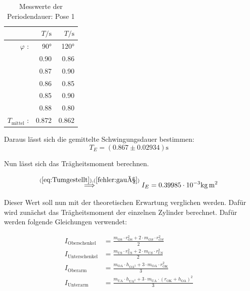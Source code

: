\begin{table}[H]
  \centering
  \caption{Messwerte der Periodendauer: Pose 1}
  \label{tab:PeriodendauerPose1}
  \begin{tabular}{rrr}
    \toprule
     & $T / \unit\second$ &  $T / \unit\second$  \\
    \midrule
    $\varphi$ : & 90° & 120° \\
    \midrule
          & 0.90 &        0.86 \\
          & 0.87 &        0.90 \\
          & 0.86 &        0.85 \\
          & 0.85 &        0.90 \\
          & 0.88 &        0.80 \\
    \midrule
    $T_{\text{mittel}}$ : & 0.872 & 0.862 \\
    \bottomrule
    \end{tabular}
\end{table}

Daraus lässt sich die gemittelte Schwingungsdauer bestimmen:
\begin{equation*}
  T_E = (0.867 \pm 0.02934) \unit\second
\end{equation*}

Nun lässt sich das Trägheitsmoment berechnen.

\begin{equation*}
  \stackrel{(\ref{eq:Tumgestellt}),(\ref{fehler:gauß})}{\implies} I_E = 0.39985 \cdot 10^{-3}  %
  \unit{\kilo\gram\meter\squared} %
\end{equation*}

Dieser Wert soll nun mit der theoretischen Erwartung verglichen werden.
Dafür wird zunächst das Trägheitsmoment der einzelnen Zylinder berechnet.
Dafür werden folgende Gleichungen verwendet:

\begin{align*}
  I_{\text{Oberschenkel}} &= \frac{m_{\text{OS}} \cdot r_{\text{OS}}^2 + 2 \cdot m_{OS} \cdot r_{OS}^2} {2} \\
  I_{\text{Unterschenkel}} &= \frac{m_{\text{US}} \cdot r_{\text{US}}^2 + 2 \cdot m_{US} \cdot r_{US}^2} {2} \\
  I_{\text{Oberarm}} &= \frac{m_{\text{OA}} \cdot h_{\text{OA}^2} + 3 \cdot m_{\text{OA}} \cdot r_{\text{OK}}^2} {3} \\
  I_{\text{Unterarm}} &= \frac{m_{\text{UA}} \cdot h_{\text{UA}^2} + 3 \cdot m_{\text{UA}} \cdot \left( r_{\text{OK}} + h_{\text{OA}}\right)^2} {3} \\
\end{align*}


